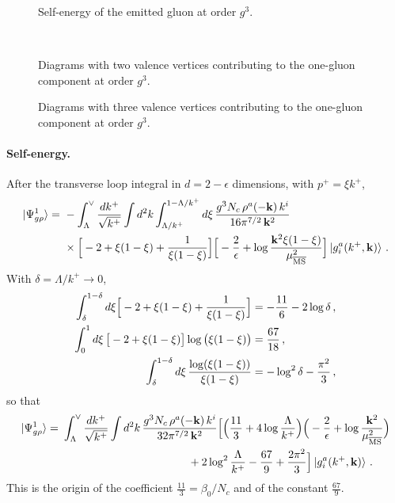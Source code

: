 \begin{figure}[t]
\centering
{}
\caption{Self-energy of the emitted gluon at order $g^3$.}
\label{fig:vac_g3_onerho}
\end{figure}

\begin{figure}[t]
\centering
{}\qquad{}\qquad{}\\[4mm]
\qquad{}
\caption{Diagrams with two valence vertices contributing to the one-gluon component at order $g^3$.}
\label{fig:vac_g3_tworho}
\end{figure}

\begin{figure}[t]
\centering
{}\qquad{}\qquad{}
\caption{Diagrams with three valence vertices contributing to the one-gluon component at order $g^3$.}
\label{fig:vac_g3_threerho}
\end{figure}

\paragraph{Self-energy.} After the transverse loop integral in $d=2-\epsilon$ dimensions, with $p^+=\xi k^+$,
\begin{align}
\ket{\Psi^{1}_{g\rho}}=\ &-\int_\Lambda^\vee\frac{dk^+}{\sqrt{k^+}}\int d^2k\int_{\Lambda/k^+}^{1-\Lambda/k^+}d\xi\,\frac{g^3N_c\,\rho^a(-\v k)\,k^i}{16\pi^{7/2}\,\v k^2}\notag\\&\times\Big[-2+\xi(1-\xi)+\frac{1}{\xi(1-\xi)}\Big]\Big[-\frac2\epsilon+\log\frac{\v k^2\xi(1-\xi)}{\mu^2_{\MS}}\Big]\ket{g^a_i(k^+,\v k)}\,.
\end{align}
With $\delta=\Lambda/k^+\to0$,
\begin{align}\label{eq:xiintegrals}
\int_\delta^{1-\delta}d\xi\Big[-2+\xi(1-\xi)+\frac{1}{\xi(1-\xi)}\Big]&=-\frac{11}{6}-2\log\delta\,,\notag\\
\int_0^1d\xi\,\big[-2+\xi(1-\xi)\big]\log\big(\xi(1-\xi)\big)&=\frac{67}{18}\,,\notag\\
\int_\delta^{1-\delta}d\xi\,\frac{\log(\xi(1-\xi))}{\xi(1-\xi)}&=-\log^2\delta-\frac{\pi^2}{3}\,,
\end{align}
so that
\begin{align}
\ket{\Psi^{1}_{g\rho}}=\ &\int_\Lambda^\vee\frac{dk^+}{\sqrt{k^+}}\int d^2k\,\frac{g^3N_c\,\rho^a(-\v k)\,k^i}{32\pi^{7/2}\,\v k^2}\Big[\Big(\frac{11}{3}+4\log\frac{\Lambda}{k^+}\Big)\Big(-\frac2\epsilon+\log\frac{\v k^2}{\mu^2_{\MS}}\Big)\notag\\&\hspace{4cm}+2\log^2\frac{\Lambda}{k^+}-\frac{67}{9}+\frac{2\pi^2}{3}\Big]\ket{g^a_i(k^+,\v k)}\,.
\end{align}
This is the origin of the coefficient $\frac{11}{3}=\beta_0/N_c$ and of the constant $\frac{67}{9}$.

